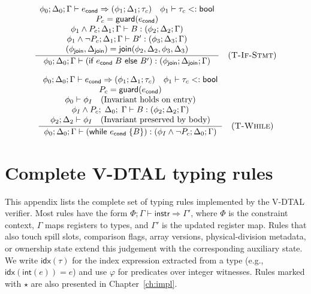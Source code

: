 $$
  \frac{
    \begin{array}{c}
      \phi_0; \Delta_0; \Gamma \vdash e_\textsf{cond} \Rightarrow (\phi_1; \Delta_1; \tau_c) \quad \phi_1 \vdash \tau_c <: \textsf{bool} \\
      P_c = \mathsf{guard}(e_\textsf{cond})                                                                                              \\
      \phi_1 \wedge P_c; \Delta_1; \Gamma \vdash B : (\phi_2; \Delta_2; \Gamma)                                                          \\
      \phi_1 \wedge \neg P_c; \Delta_1; \Gamma \vdash B' : (\phi_3; \Delta_3; \Gamma)                                                    \\
      (\phi_\textsf{join}, \Delta_\textsf{join}) = \textsf{join}(\phi_2, \Delta_2, \phi_3, \Delta_3)
    \end{array}
  }{
    \phi_0; \Delta_0; \Gamma \vdash (\textsf{if } e_\textsf{cond}\; B \textsf{ else } B') : (\phi_\textsf{join}; \Delta_\textsf{join}; \Gamma)
  } \quad (\textsc{T-If-Stmt})
$$

$$
  \frac{
    \begin{array}{c}
      \phi_0; \Delta_0; \Gamma \vdash e_\textsf{cond} \Rightarrow (\phi_1; \Delta_1; \tau_c) \quad \phi_1 \vdash \tau_c <: \textsf{bool} \\
      P_c = \mathsf{guard}(e_\textsf{cond})                                                                                              \\
      \phi_0 \vdash \phi_I \quad \text{(Invariant holds on entry)}                                                                       \\
      \phi_I \wedge P_c;\; \Delta_0;\; \Gamma \vdash B : (\phi_2; \Delta_2; \Gamma)                                                      \\
      \phi_2; \Delta_2 \vdash \phi_I \quad \text{(Invariant preserved by body)}
    \end{array}
  }{
    \phi_0; \Delta_0; \Gamma \vdash (\textsf{while } e_\textsf{cond}\;\{B\}) : (\phi_I \wedge \neg P_c; \Delta_0; \Gamma)
  } \quad (\textsc{T-While})
$$

\chapter{Complete V-DTAL typing rules}\label{app:dtal-rules}

This appendix lists the complete set of typing rules implemented by the V-DTAL verifier. Most rules have the form $\Phi; \Gamma \vdash \textsf{instr} \Rightarrow \Gamma'$, where $\Phi$ is the constraint context, $\Gamma$ maps registers to types, and $\Gamma'$ is the updated register map. Rules that also touch spill slots, comparison flags, array versions, physical-division metadata, or ownership state extend this judgement with the corresponding auxiliary state. We write $\textsf{idx}(\tau)$ for the index expression extracted from a type (e.g., $\textsf{idx}(\textsf{int}(e)) = e$) and use $\varphi$ for predicates over integer witnesses. Rules marked with $\star$ are also presented in Chapter~\ref{ch:impl}.

